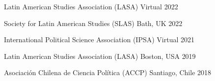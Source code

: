 






\vspace{1mm}

\begin{cvhonors}
\cvconf
{Latin American Studies Association (LASA)} 
{Virtual}
{2022}
\end{cvhonors}

\begin{cvhonors}
\cvconf
{Society for Latin American Studies (SLAS)} 
{Bath, UK}
{2022}
\end{cvhonors}


\begin{cvhonors}
\cvconf
{International Political Science Association (IPSA)} 
{Virtual}
{2021}
\end{cvhonors}

\begin{cvhonors}
\cvconf
{Latin American Studies Association (LASA)} 
{Boston, USA}
{2019}
\end{cvhonors}

\begin{cvhonors}
\cvconf
{Asociación Chilena de Ciencia Política (ACCP)} 
{Santiago, Chile}
{2018}
\end{cvhonors}

